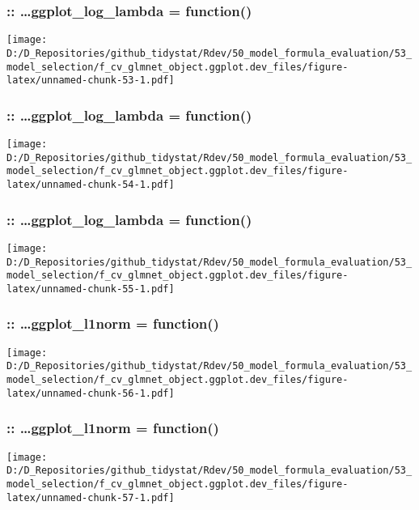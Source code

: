\documentclass[
]{article}
\begin{document}
\hypertarget{ggplot_log_lambda-function-1}{%
\subsubsection{:: \ldots ggplot\_log\_lambda =
function()}\label{ggplot_log_lambda-function-1}}

\texttt{[image: D:/D\_Repositories/github\_tidystat/Rdev/50\_model\_formula\_evaluation/53\_model\_selection/f\_cv\_glmnet\_object.ggplot.dev\_files/figure-latex/unnamed-chunk-53-1.pdf]}

\hypertarget{ggplot_log_lambda-function-2}{%
\subsubsection{:: \ldots ggplot\_log\_lambda =
function()}\label{ggplot_log_lambda-function-2}}

\texttt{[image: D:/D\_Repositories/github\_tidystat/Rdev/50\_model\_formula\_evaluation/53\_model\_selection/f\_cv\_glmnet\_object.ggplot.dev\_files/figure-latex/unnamed-chunk-54-1.pdf]}

\hypertarget{ggplot_log_lambda-function-3}{%
\subsubsection{:: \ldots ggplot\_log\_lambda =
function()}\label{ggplot_log_lambda-function-3}}

\texttt{[image: D:/D\_Repositories/github\_tidystat/Rdev/50\_model\_formula\_evaluation/53\_model\_selection/f\_cv\_glmnet\_object.ggplot.dev\_files/figure-latex/unnamed-chunk-55-1.pdf]}

\hypertarget{ggplot_l1norm-function}{%
\subsubsection{:: \ldots ggplot\_l1norm =
function()}\label{ggplot_l1norm-function}}

\texttt{[image: D:/D\_Repositories/github\_tidystat/Rdev/50\_model\_formula\_evaluation/53\_model\_selection/f\_cv\_glmnet\_object.ggplot.dev\_files/figure-latex/unnamed-chunk-56-1.pdf]}

\hypertarget{ggplot_l1norm-function-1}{%
\subsubsection{:: \ldots ggplot\_l1norm =
function()}\label{ggplot_l1norm-function-1}}

\texttt{[image: D:/D\_Repositories/github\_tidystat/Rdev/50\_model\_formula\_evaluation/53\_model\_selection/f\_cv\_glmnet\_object.ggplot.dev\_files/figure-latex/unnamed-chunk-57-1.pdf]}
\end{document}

